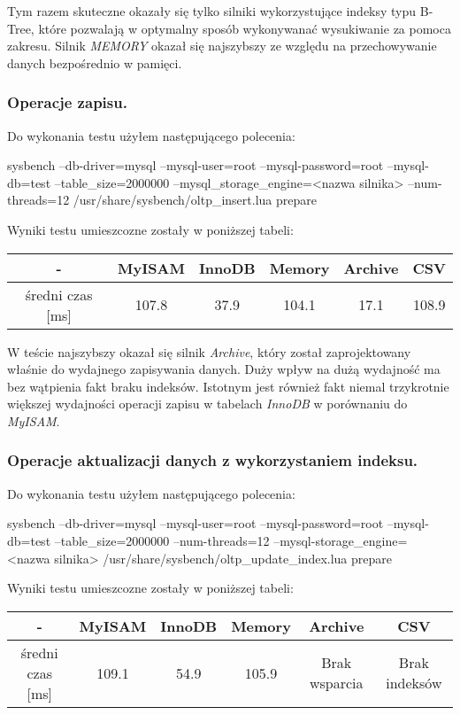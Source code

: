 Tym razem skuteczne okazały się tylko silniki wykorzystujące indeksy typu B-Tree, które pozwalają w optymalny sposób wykonywanać wysukiwanie za pomoca zakresu. Silnik \textit{MEMORY} okazał się najszybszy ze względu na przechowywanie danych bezpośrednio w pamięci.

\subsubsection{Operacje zapisu.}

Do wykonania testu użyłem następującego polecenia:
\begin{spverbatim}
	 sysbench --db-driver=mysql --mysql-user=root --mysql-password=root --mysql-db=test --table_size=2000000 --mysql_storage_engine=<nazwa silnika> --num-threads=12 /usr/share/sysbench/oltp_insert.lua prepare
\end{spverbatim}

Wyniki testu umieszcozne zostały w poniższej tabeli:
\begin{center}
	\begin{tabular}{ | c | c | c | c | c | c |}
		\hline
		- & MyISAM & InnoDB & Memory & Archive & CSV  \\ 
		\hline
		średni czas [ms] & 107.8 & 37.9 & 104.1 & 17.1 & 108.9 \\
		\hline
	\end{tabular}
\end{center}

W teście najszybszy okazał się silnik \textit{Archive}, który został zaprojektowany właśnie do wydajnego zapisywania danych. Duży wpływ na dużą wydajność ma bez wątpienia fakt braku indeksów. Istotnym jest również fakt niemal trzykrotnie większej wydajności operacji zapisu w tabelach \textit{InnoDB} w porównaniu do \textit{MyISAM}.

\subsubsection{Operacje aktualizacji danych z wykorzystaniem indeksu.}

Do wykonania testu użyłem następującego polecenia:
\begin{spverbatim}
	sysbench --db-driver=mysql --mysql-user=root --mysql-password=root --mysql-db=test --table_size=2000000 --num-threads=12 --mysql-storage_engine=
	<nazwa silnika> /usr/share/sysbench/oltp_update_index.lua prepare
\end{spverbatim}

Wyniki testu umieszcozne zostały w poniższej tabeli:
\begin{center}
	\begin{tabular}{ | c | c | c | c | c | c |}
		\hline
		- & MyISAM & InnoDB & Memory & Archive & CSV  \\ 
		\hline
		średni czas [ms] & 109.1 & 54.9 & 105.9 & Brak wsparcia & Brak indeksów \\
		\hline
	\end{tabular}
\end{center}

